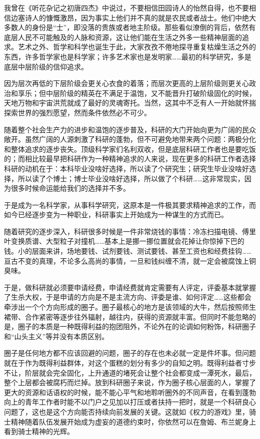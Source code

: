 \documentclass[
]{book}
\begin{document}
我曾在《听花杂记之初唐四杰》中说过，不要相信田园诗人的怡然自得，也不要相信边塞诗人的慷慨激昂，因为事实上他们并不真的就是农民或者战士。他们中绝大多数人的身份是``士''，即没落的贵族或者地主阶级。那些看似潦倒的背后，依然有底层人民不可能触及的人脉和资源，这让他们能在生活之外多一些精神层面的追求。艺术之外、哲学和科学也诞生于此，大家孜孜不倦地探寻重复枯燥生活之外的东西，许多哲学家也是科学家；许多艺术家也是发明家\ldots\ldots 最初的科学研究，多是底层中层阶级的信仰追求。

因为层次再低的下层阶级会更关心衣食的着落；而层次更高的上层阶级则更关心政治和享乐；但中层阶级的精英在不满足于温饱，又不能晋升打破阶级固化的时候，天地万物和宇宙洪荒就成了最好的灵魂寄托。当然，这其中不乏有人一开始就怀揣探索世界的强烈愿望，然而条件依然必不可少。

随着整个社会生产力的进步和温饱的逐步普及，科研的大门开始向更为广阔的民众敞开。虽然广阔的人源刺激了科研的蓬勃，但不可避免地带来两个问题：两极分化和整体追求的逐步丧失。顶级科学家们名利双收，但是底层科研工作者也是要吃饭的；而相比较最早把科研作为一种精神追求的人来说，现在更多的科研工作者选择科研的动机在于：本科毕业没啥好选择，所以读了个研究生；研究生毕业没啥好选择，所以读了个博士；博士毕业没啥好选择，所以做了个科研\ldots\ldots 这非常现实，因为很多时候命运能给我们的选择并不多。

于是成为一名科学家，从事科学研究，这原本是一件极其要求精神追求的工作，而如今已经逐步变为一种职业，科研事实上开始成为一种谋生的方式而已。

随着研究的逐步深入，科研很多时候是一件非常烧钱的事情：冷冻扫描电镜、傅里叶变换质谱、大型粒子对撞机\ldots\ldots 基本上是挪一挪位置就会花掉让你惊掉下巴的钱。小的层面来讲，场地要钱、试剂要钱、测试要钱、甚至工资也和经费挂钩\ldots\ldots 亘古不变的真理，不论多么高尚的事情，一旦和钱纠缠不清，就一定会被腐蚀上铜臭味。

于是，做科研就必须要申请经费，申请经费就肯定需要有人评定，评委基本就掌握了生杀大权，于是申请的方向是不是主流方向、评委是谁、如何评定\ldots\ldots 这些都会牵涉出一个个方向形成的圈子。圈子最核心的地方是该领域的大牛，然后按照师生裙带、合作紧密等逐步往外辐射，越往内，获得的资源就丰富。但同时不能忽略的是，圈子的本质是一种既得利益的抱团阻外，不论外在的论调如何粉饰，科研圈子和``山头主义''等并没有本质区别。

圈子是任何地方都不应该回避的问题，圈子的存在也未必就一定是件坏事。但问题就在于作为既得利益群体，对这个蛋糕的划分有多少的自知之明。既得利益者寸步不让，阶层就会完全固化，上升通道的堵死会让整个社会都变成一潭死水，最后，整个上层都会被腐朽而烂掉。放到科研圈子来说，作为圈子核心层面的人，掌握了更大的资源和话语权的时候，能不能心平气和地聆听圈外的不同声音，在看到蓬勃向上的青年工作者时能不以门户之见加以打压或者扶持一把时，就是一个科研良心问题了，这也是这个方向能否持续向前发展的关键。这就如《权力的游戏》里，骑士精神随着队伍发展开始成为虚妄的道德约束时，你依然可以在詹姆、布兰妮身上看到骑士精神的光辉。
\end{document}
